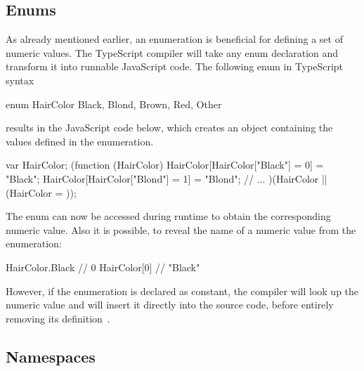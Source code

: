 \subsection{Enums}
\label{sec:ts-enums}

As already mentioned earlier, an enumeration is beneficial for defining a set of numeric values. The TypeScript compiler will take any enum declaration and transform it into runnable JavaScript code. The following enum in TypeScript syntax
\begin{JsCode}[numbers=none]
enum HairColor {
  Black, Blond, Brown, Red, Other
}
\end{JsCode}
results in the JavaScript code below, which creates an object containing the values defined in the enumeration.
\begin{JsCode}[numbers=none]
var HairColor;
(function (HairColor) {
    HairColor[HairColor["Black"] = 0] = "Black";
    HairColor[HairColor["Blond"] = 1] = "Blond";
    // ...
})(HairColor || (HairColor = {}));
\end{JsCode}
The enum can now be accessed during runtime to obtain the corresponding numeric value. Also it is possible, to reveal the name of a numeric value from the enumeration:
\begin{JsCode}[numbers=none]
HairColor.Black // 0
HairColor[0] // "Black"
\end{JsCode}
However, if the enumeration is declared as constant, the compiler will look up the numeric value and will insert it directly into the source code, before entirely removing its definition~\cite{TypeScriptHandbook:Enums}.

\subsection{Namespaces}
\label{sec:ts-namespaces}

